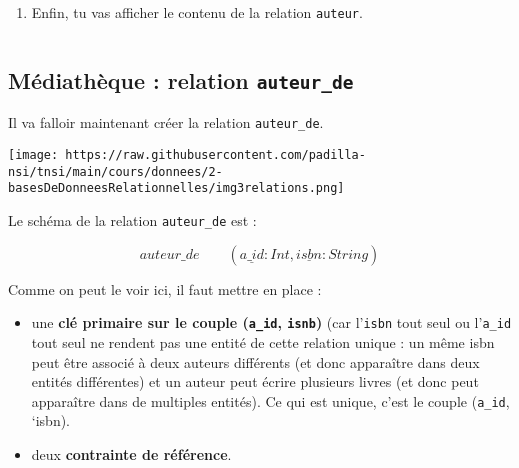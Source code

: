 \documentclass[a4paper,17pt]{extarticle}
\makeatletter
\let\origfigure\figure
\let\endorigfigure\endfigure
\renewenvironment{figure}[1][2] {
    \expandafter\origfigure\expandafter[H]
} {
    \endorigfigure
}
\providecommand{\tightlist}{%
      \setlength{\itemsep}{0pt}\setlength{\parskip}{0pt}}
\newcommand{\boxspacing}{\kern\kvtcb@left@rule\kern\kvtcb@boxsep}
\newcommand{\prompt}[4]{
        \ttfamily\llap{{\color{#2}[#3]:\hspace{3pt}#4}}\vspace{-\baselineskip}
    }
\makeatother
\begin{document}
        {\scriptsize
    \begin{tcolorbox}[breakable, size=fbox, boxrule=1pt, pad at break*=1mm,colback=cellbackground, colframe=cellborder]
\prompt{In}{incolor}{ }{\boxspacing}
\begin{Verbatim}[commandchars=\\\{\}]

\end{Verbatim}
\end{tcolorbox}
    }

    \begin{enumerate}
\def\labelenumi{(\arabic{enumi})}
\setcounter{enumi}{2}
\tightlist
\item
  Enfin, tu vas afficher le contenu de la relation \texttt{auteur}.
\end{enumerate}

        {\scriptsize
    \begin{tcolorbox}[breakable, size=fbox, boxrule=1pt, pad at break*=1mm,colback=cellbackground, colframe=cellborder]
\prompt{In}{incolor}{ }{\boxspacing}
\begin{Verbatim}[commandchars=\\\{\}]

\end{Verbatim}
\end{tcolorbox}
    }

    \hypertarget{muxe9diathuxe8que-relation-auteur_de}{%
\subsection{\texorpdfstring{Médiathèque : relation
\texttt{auteur\_de}}{Médiathèque : relation auteur\_de}}\label{muxe9diathuxe8que-relation-auteur_de}}

    Il va falloir maintenant créer la relation \texttt{auteur\_de}.

\begin{figure}
\centering
\texttt{[image: https://raw.githubusercontent.com/padilla-nsi/tnsi/main/cours/donnees/2-basesDeDonneesRelationnelles/img3relations.png]}
\caption{Schéma des 3 relations}
\end{figure}

    Le schéma de la relation \texttt{auteur\_de} est :

\[auteur\_de \qquad (\underline{a\_id}: Int , \underline{isbn}: String)\]

Comme on peut le voir ici, il faut mettre en place :

\begin{itemize}
\tightlist
\item
  une \textbf{clé primaire sur le couple (\texttt{a\_id},
  \texttt{isnb})} (car l'\texttt{isbn} tout seul ou l'\texttt{a\_id}
  tout seul ne rendent pas une entité de cette relation unique : un même
  isbn peut être associé à deux auteurs différents (et donc apparaître
  dans deux entités différentes) et un auteur peut écrire plusieurs
  livres (et donc peut apparaître dans de multiples entités). Ce qui est
  unique, c'est le couple (\texttt{a\_id}, `isbn).
\item
  deux \textbf{contrainte de référence}.
\end{itemize}
\end{document}
